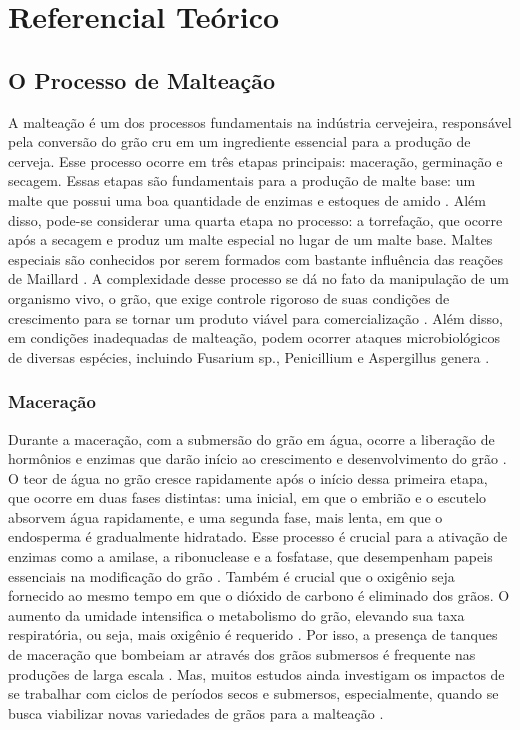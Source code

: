 \chapter[Referencial Teórico]{Referencial Teórico}

\section{O Processo de Malteação}

A malteação é um dos processos fundamentais na indústria cervejeira, responsável pela conversão do grão cru em um ingrediente essencial para a produção de cerveja. Esse processo ocorre em três etapas principais: maceração, germinação e secagem. Essas etapas são fundamentais para a produção de malte base: um malte que possui uma boa quantidade de enzimas e estoques de amido \cite{BRIGGS2004,CENCI2021}. Além disso, pode-se considerar uma quarta etapa no processo: a torrefação, que ocorre após a secagem e produz um malte especial no lugar de um malte base. Maltes especiais são conhecidos por serem formados com bastante influência das reações de Maillard \cite{COGHE2004}. A complexidade desse processo se dá no fato da manipulação de um organismo vivo, o grão, que exige controle rigoroso de suas condições de crescimento para se tornar um produto viável para comercialização \cite{MALLETT2022}. Além disso, em condições inadequadas de malteação, podem ocorrer ataques microbiológicos de diversas espécies, incluindo Fusarium sp., Penicillium e Aspergillus genera \cite{LUARASI2016}.

\subsection{Maceração}

Durante a maceração, com a submersão do grão em água, ocorre a liberação de hormônios e enzimas que darão início ao crescimento e desenvolvimento do grão \cite{LEWIS2012}. O teor de água no grão cresce rapidamente após o início dessa primeira etapa, que ocorre em duas fases distintas: uma inicial, em que o embrião e o escutelo absorvem água rapidamente, e uma segunda fase, mais lenta, em que o endosperma é gradualmente hidratado. Esse processo é crucial para a ativação de enzimas como a amilase, a ribonuclease e a fosfatase, que desempenham papeis essenciais na modificação do grão \cite{REYNOLDS1966}. Também é crucial que o oxigênio seja fornecido ao mesmo tempo em que o dióxido de carbono é eliminado dos grãos. O aumento da umidade intensifica o metabolismo do grão, elevando sua taxa respiratória, ou seja, mais oxigênio é requerido \cite{KUNZE1996}. Por isso, a presença de tanques de maceração que bombeiam ar através dos grãos submersos é frequente nas produções de larga escala \cite{CENCI2021}. Mas, muitos estudos ainda investigam os impactos de se trabalhar com ciclos de períodos secos e submersos, especialmente, quando se busca viabilizar novas variedades de grãos para a malteação \cite{MAYER2014,TURNER2019}.

